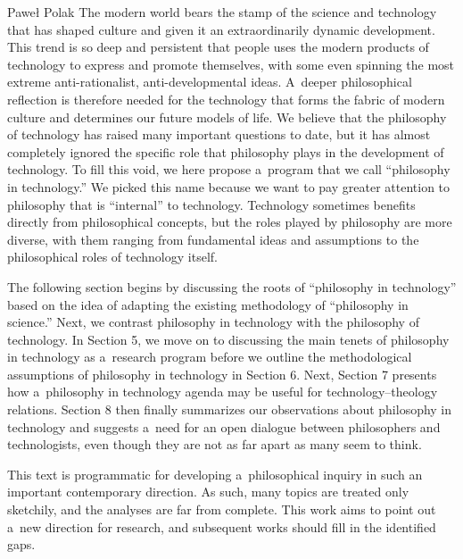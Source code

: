 \begin{artengenv}{Paweł Polak}
\lettrine[loversize=0.13,lines=2,lraise=-0.03,nindent=0em,findent=0.2pt]%
{T}{}he modern world bears the stamp of the science and technology that has shaped culture and given it an extraordinarily dynamic development. This trend is so deep and persistent that people uses the modern products of technology to express and promote themselves, with some even spinning the most extreme anti-rationalist, anti-developmental ideas. A~deeper philosophical reflection is therefore needed for the technology that forms the fabric of modern culture and determines our future models of life. We believe that the philosophy of technology has raised many important questions to date, but it has almost completely ignored the specific role that philosophy plays in the development of technology. To fill this void, we here propose a~program that we call ``philosophy in technology.'' We picked this name because we want to pay greater attention to philosophy that is ``internal'' to technology. Technology sometimes benefits directly from philosophical concepts, but the roles played by philosophy are more diverse, with them ranging from fundamental ideas and assumptions to the philosophical roles of technology itself. 
\parencite[For more on the metaphysical roles of technology see, for example,][]{Bolter1984TuringsMan}%




The following section begins by discussing the roots of ``philosophy in technology'' based on the idea of adapting the existing methodology of ``philosophy in science.'' Next, we contrast philosophy in technology with the philosophy of technology. In Section 5, we move on to discussing the main tenets of philosophy in technology as a~research program before we outline the methodological assumptions of philosophy in technology in Section 6. Next, Section 7 presents how a~philosophy in technology agenda may be useful for technology–theology relations. Section 8 then finally summarizes our observations about philosophy in technology and suggests a~need for an open dialogue between philosophers and technologists, even though they are not as far apart as many seem to think.



This text is programmatic for developing a~philosophical inquiry in such an important contemporary direction. As such, many topics are treated only sketchily, and the analyses are far from complete. This work aims to point out a~new direction for research, and subsequent works should fill in the identified gaps.




\end{artengenv}

